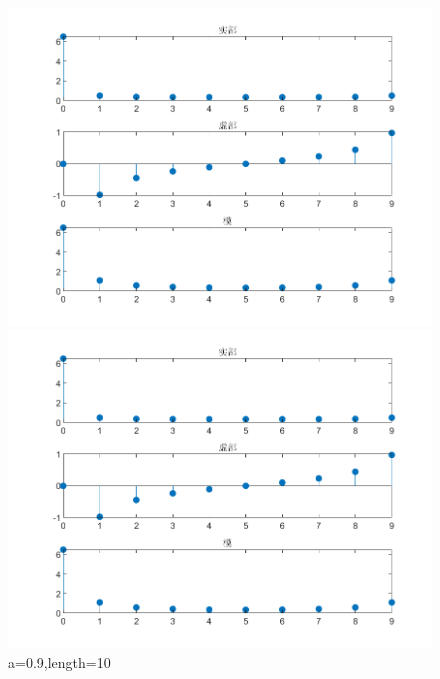 \documentclass{../source/zjureport}
\begin{document}
                \begin{figure}[H]
                    \centering
                    \begin{minipage}[t]{0.48\textwidth}
                    \centering
                    \includegraphics[width=\textwidth]{figure/频谱_实指数序列_a=09,length=10.png}
                    \end{minipage}
                    \begin{minipage}[t]{0.48\textwidth}
                    \centering
                    \includegraphics[width=\textwidth]{figure/频谱_实指数序列_a=09,length=10.png}
                    \end{minipage}
                    \caption{a=0.9,length=10}
                \end{figure}
                
\end{document}
